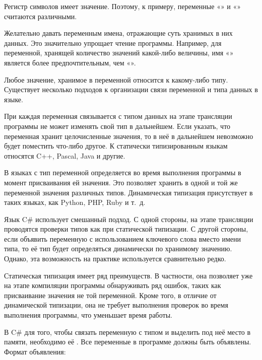 Регистр символов имеет значение. Поэтому, к примеру, переменные
«» и «» считаются различными.

Желательно давать переменным имена, отражающие суть хранимых в них
данных. Это значительно упрощает чтение программы. Например, для
переменной, хранящей количество значений какой-либо величины, имя
«» является более предпочтительным, чем
«».

Любое значение, хранимое в переменной относится к какому-либо типу.
Существует несколько подходов к организации связи переменной и типа
данных в языке.

При  каждая
переменная связывается с типом данных на этапе трансляции программы не
может изменять свой тип в дальнейшем. Если указать, что переменная
хранит целочисленные значения, то в неё в дальнейшем невозможно будет
поместить что-либо другое.  К статически типизированным языкам
относятся C++, Pascal, Java и другие.

В языках с  тип
переменной определяется во время выполнения программы в момент
присваивания ей значения. Это позволяет хранить в одной и той же
переменной значения различных типов.  Динамическая типизация
присутствует в таких языках, как Python, PHP, Ruby и т.~д.

Язык C\# использует смешанный подход. С одной стороны, на этапе
трансляции проводятся проверки типов как при статической типизации. С
другой стороны, если объявить переменную с использованием ключевого
слова  вместо имени типа, то её тип будет определяться
динамически по хранимому значению. Однако, эта возможность на практике
используется сравнительно редко.

Статическая типизация имеет ряд преимуществ. В частности, она
позволяет уже на этапе компиляции программы обнаруживать ряд ошибок,
таких как присваивание значения не той переменной. Кроме того, в
отличие от динамической типизации, она не требует выполнения проверок
во время выполнения программы, что уменьшает время работы.

В C\# для того, чтобы связать переменную с типом и выделить под неё
место в памяти, необходимо её
. Все переменные в программе
должны быть объявлены. Формат объявления:

\begin{center}
  \Lst{ }\Lst{;}
\par\end{center}

